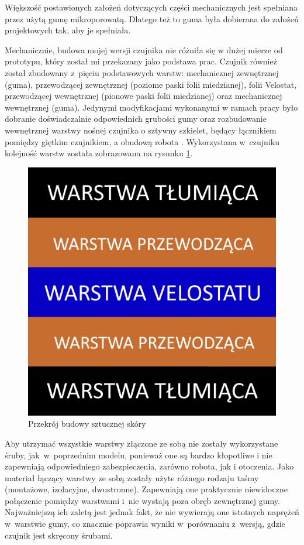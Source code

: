 Większość postawionych założeń dotyczących części mechanicznych jest spełniana przez użytą gumę mikroporowatą. Dlatego też to guma była dobierana do założeń projektowych tak, aby je spełniała.

Mechanicznie, budowa mojej wersji czujnika nie różniła się w dużej mierze od prototypu, który został mi przekazany jako podstawa prac. Czujnik również został zbudowany z~pięciu podstawowych warstw: mechanicznej zewnętrznej (guma), przewodzącej zewnętrznej (poziome paski folii miedzianej), folii Velostat, przewodzącej wewnętrznej (pionowe paski folii miedzianej) oraz mechanicznej wewnętrznej (guma). Jedynymi modyfikacjami wykonanymi w ramach pracy było dobranie doświadczalnie odpowiednich grubości gumy oraz rozbudowanie wewnętrznej warstwy nośnej czujnika o sztywny szkielet, będący łącznikiem pomiędzy giętkim czujnikiem, a obudową robota \cite{b_report_otrzymane}. Wykorzystana w~czujniku kolejność warstw została zobrazowana na rysunku \ref{f_otrzymany_budowa}.

\begin{figure}[!h]
    \centering 
    \includegraphics[width=0.5\linewidth]{img/otrzymane_budowa.png}
    \caption{Przekrój budowy sztucznej skóry \cite{b_report_otrzymane}}
    \label{f_otrzymany_budowa}
\end{figure}

Aby utrzymać wszystkie warstwy złączone ze sobą nie zostały wykorzystane śruby, jak~w~poprzednim modelu, ponieważ one są bardzo kłopotliwe i nie zapewniają odpowiedniego zabezpieczenia, zarówno robota, jak i otoczenia. Jako materiał łączący warstwy ze sobą zostały użyte różnego rodzaju taśmy (montażowe, izolacyjne, dwustronne). Zapewniają one praktycznie niewidoczne połączenie pomiędzy warstwami i~nie wystają poza obręb zewnętrznej gumy. Najważniejszą ich zaletą jest jednak fakt, że nie wywierają one istotnych naprężeń w~warstwie gumy, co znacznie poprawia wyniki w~porównaniu z~wersją, gdzie czujnik jest skręcony śrubami.

